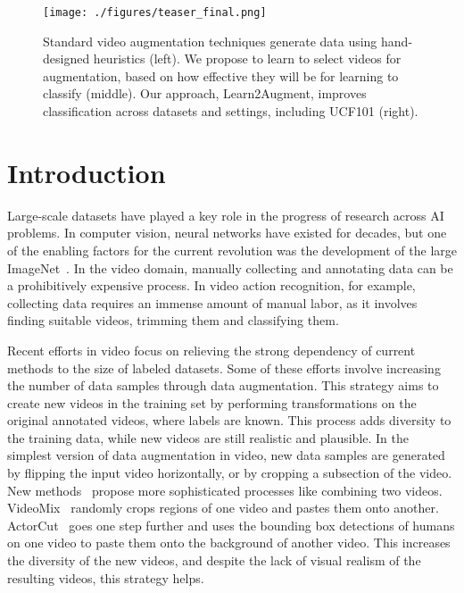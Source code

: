 \documentclass[runningheads]{llncs}
\newcommand{\Method}{Learn2Augment\xspace}
\begin{document}
\begin{figure}
\begin{center}
    \centering
\texttt{[image: ./figures/teaser\_final.png]}
    \caption{Standard video augmentation techniques generate data using hand-designed heuristics (left). We propose to learn to select videos for augmentation, based on how effective they will be for learning to classify (middle). Our approach, \Method, improves classification across datasets and settings, including UCF101 (right). }\end{center}
\end{figure}

\section{Introduction}
\label{sec:intro}


Large-scale datasets have played a key role in the progress of research across AI problems. In computer vision, neural networks have existed for decades, but one of the enabling factors for the current revolution was the development of the large ImageNet~\cite{deng2009imagenet}.  
In the video domain, manually collecting and annotating data can be a prohibitively expensive process. In video action recognition, for example, collecting data requires an immense amount of manual labor, as it involves finding suitable videos, trimming them and classifying them. 



Recent efforts in video focus on relieving the strong dependency of current methods to the size of labeled datasets. Some of these efforts \cite{sun2021autoflow,actorcut} involve increasing the number of data samples through data augmentation. This strategy aims to create new videos in the training set by performing transformations on the original annotated videos, where labels are known. This process adds diversity to the training data, while new videos are still realistic and plausible. In the simplest version of data augmentation in video, new data samples are generated by flipping the input video horizontally, or by cropping a subsection of the video. New methods~\cite{actorcut,videomix} propose more sophisticated processes like combining two videos. VideoMix~\cite{videomix}
randomly crops regions of one video and pastes them onto another. ActorCut~\cite{actorcut} goes one step further and uses the bounding box detections of humans on one video to paste them onto the background of another video. This increases the diversity of the new videos, and despite the lack of visual realism of the resulting videos, this strategy helps.   
\end{document}
